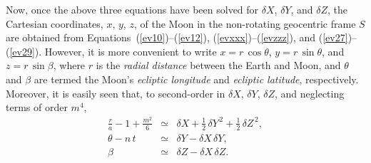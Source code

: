 Now,  once the above three equations have been solved for $\delta X$, $\delta Y$, and $\delta Z$, the Cartesian coordinates, $x$, $y$, $z$, of the Moon in the non-rotating geocentric
 frame $S$ are obtained from Equations~(\ref{ev10})--(\ref{ev12}), (\ref{evxxx})--(\ref{evzzz}),  and (\ref{ev27})--(\ref{ev29}). However, it is  more convenient to write
 $x=r\,\cos\theta$, $y=r\,\sin\theta$, and $z=r\,\sin\beta$, where $r$ is the {\em radial distance}\/ between the Earth and Moon, and $\theta$ and $\beta$ are termed the Moon's {\em ecliptic
 longitude}\/ and {\em ecliptic latitude}, respectively. Moreover, it is easily seen that, to second-order in $\delta X$, $\delta Y$,
  $\delta Z$, and neglecting terms of order $m^4$, 
 \begin{eqnarray}\label{ev33}
 \frac{r}{a}-1+\frac{m^2}{6}&\simeq&\delta X +\frac{1}{2}\,\delta Y^{\,2}+\frac{1}{2}\,\delta Z^{\,2},\\[0.5ex]
 \theta - n\,t&\simeq&  \delta Y - \delta X\,\delta Y,\\[0.5ex]
 \beta&\simeq& \delta Z-\delta X\,\delta Z.\label{ev35}
 \end{eqnarray}
 
